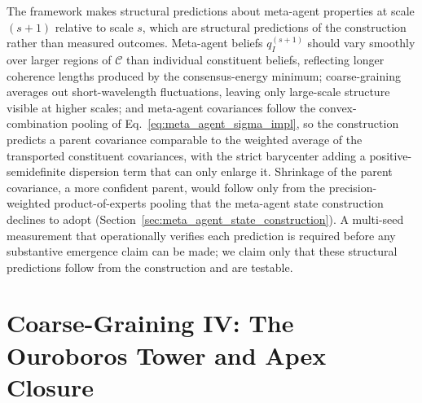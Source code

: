 \documentclass[11pt]{article}
\begin{document}
The framework makes structural predictions about meta-agent properties at scale $(s+1)$ relative to scale $s$, which are structural predictions of the construction rather than measured outcomes. Meta-agent beliefs $q_I^{(s+1)}$ should vary smoothly over larger regions of $\mathcal{C}$ than individual constituent beliefs, reflecting longer coherence lengths produced by the consensus-energy minimum; coarse-graining averages out short-wavelength fluctuations, leaving only large-scale structure visible at higher scales; and meta-agent covariances follow the convex-combination pooling of Eq.~\eqref{eq:meta_agent_sigma_impl}, so the construction predicts a parent covariance comparable to the weighted average of the transported constituent covariances, with the strict barycenter adding a positive-semidefinite dispersion term that can only enlarge it. Shrinkage of the parent covariance, a more confident parent, would follow only from the precision-weighted product-of-experts pooling that the meta-agent state construction declines to adopt (Section~\ref{sec:meta_agent_state_construction}). A multi-seed measurement that operationally verifies each prediction is required before any substantive emergence claim can be made; we claim only that these structural predictions follow from the construction and are testable.

\section{Coarse-Graining IV: The Ouroboros Tower and Apex Closure}\label{sec:ouroboros}
\end{document}
